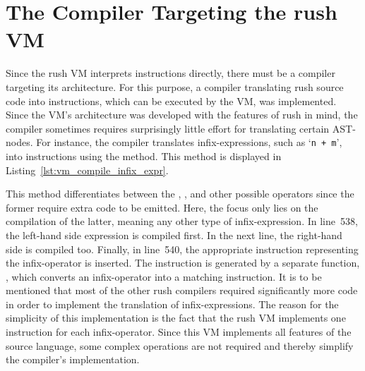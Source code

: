 \section{The Compiler Targeting the rush VM}\label{sec:vm_compiler}

Since the rush VM interprets instructions directly, there must be a compiler targeting its architecture.
For this purpose, a compiler translating rush source code into instructions, which can be executed by the VM, was implemented.
Since the VM's architecture was developed with the features of rush in mind, the compiler sometimes requires surprisingly little effort for translating certain AST-nodes.
For instance, the compiler translates infix-expressions, such as `\texttt{n + m}', into instructions using the  method.
This method is displayed in Listing~\ref{lst:vm_compile_infix_expr}.


This method differentiates between the \qVerb{||}, \qVerb{&&}, and other possible operators since the former require extra code to be emitted.
Here, the focus only lies on the compilation of the latter, meaning any other type of infix-expression.
In line~538, the left-hand side expression is compiled first.
In the next line, the right-hand side is compiled too.
Finally, in line~540, the appropriate instruction representing the infix-operator is inserted.
The instruction is generated by a separate function, , which converts an infix-operator into a matching instruction.
It is to be mentioned that most of the other rush compilers required significantly more code in order to implement the translation of infix-expressions.
The reason for the simplicity of this implementation is the fact that the rush VM implements one instruction for each infix-operator.
Since this VM implements all features of the source language, some complex operations are not required and thereby simplify the compiler's implementation.


